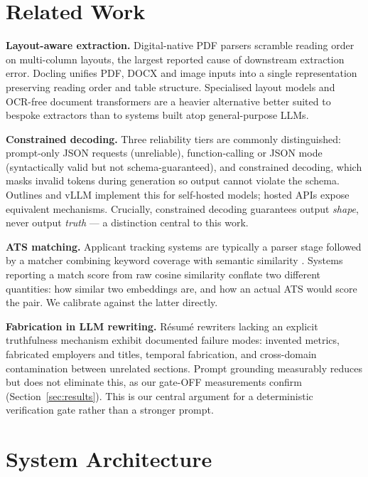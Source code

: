 \documentclass[conference]{IEEEtran}
\begin{document}
\section{Related Work}

\textbf{Layout-aware extraction.} Digital-native PDF parsers scramble reading
order on multi-column layouts, the largest reported cause of downstream
extraction error. Docling \cite{docling} unifies PDF, DOCX and image inputs into
a single representation preserving reading order and table structure.
Specialised layout models \cite{layoutlm} and OCR-free document transformers
\cite{donut} are a heavier alternative better suited to bespoke extractors than
to systems built atop general-purpose LLMs.

\textbf{Constrained decoding.} Three reliability tiers are commonly
distinguished: prompt-only JSON requests (unreliable), function-calling or JSON
mode (syntactically valid but not schema-guaranteed), and constrained decoding,
which masks invalid tokens during generation so output cannot violate the
schema. Outlines \cite{outlines} and vLLM \cite{vllm} implement this for
self-hosted models; hosted APIs expose equivalent mechanisms. Crucially,
constrained decoding guarantees output \emph{shape}, never output \emph{truth}
--- a distinction central to this work.

\textbf{ATS matching.} Applicant tracking systems are typically a parser stage
followed by a matcher combining keyword coverage with semantic similarity
\cite{sbert}. Systems reporting a match score from raw cosine similarity
conflate two different quantities: how similar two embeddings are, and how an
actual ATS would score the pair. We calibrate against the latter directly.

\textbf{Fabrication in LLM rewriting.} Résumé rewriters lacking an explicit
truthfulness mechanism exhibit documented failure modes: invented metrics,
fabricated employers and titles, temporal fabrication, and cross-domain
contamination between unrelated sections. Prompt grounding measurably reduces
but does not eliminate this, as our gate-OFF measurements confirm
(Section~\ref{sec:results}). This is our central argument for a deterministic
verification gate rather than a stronger prompt.

\section{System Architecture}
\end{document}
